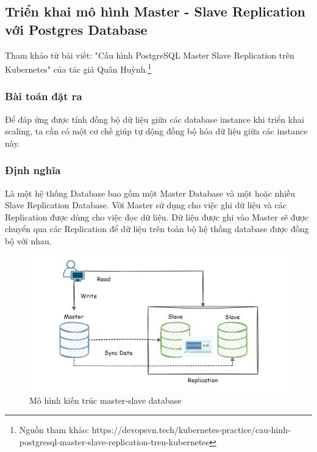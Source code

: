 \subsection{Triển khai mô hình Master - Slave Replication với Postgres Database}
\noindent Tham khảo từ bài viết: "Cấu hình PostgreSQL Master Slave Replication trên Kubernetes" của tác giả Quân Huỳnh.\footnote{Nguồn tham khảo: https://devopsvn.tech/kubernetes-practice/cau-hinh-postgresql-master-slave-replication-tren-kubernetes}\\[0.5cm]
\subsubsection{Bài toán đặt ra}
\noindent Để đáp ứng được tính đồng bộ dữ liệu giữa các database instance khi triển khai scaling, ta cần có một cơ chế giúp tự dộng đồng bộ hóa dữ liệu giữa các instance này.
\subsubsection{Định nghĩa}
\noindent Là một hệ thống Database bao gồm một Master Database và một hoặc nhiều Slave Replication Database. Với Master sử dụng cho việc ghi dữ liệu và các Replication được dùng cho việc đọc dữ liệu. Dữ liệu được ghi vào Master sẽ được chuyển qua các Replication để dữ liệu trên toàn bộ hệ thống database được đồng bộ với nhau.
\begin{figure}[H]
  \begin{center}
    \includegraphics[scale=0.22]{images/phat/master-slave-archi.jpg}
    \caption{Mô hình kiến trúc master-slave database}
  \end{center}
\end{figure}
